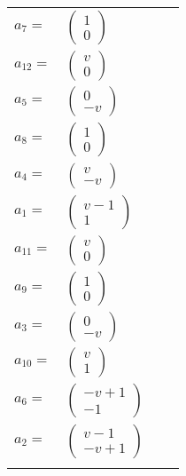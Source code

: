 \documentclass[1p]{elsarticle_modified}
\theoremstyle{definition}
\begin{document}
\begin{tabular}{m{7pt} m{180pt} m{7pt} m{180pt} }
\flushright $a_{7}=$&$\begin{pmatrix}1\\0\end{pmatrix}$ \\
\flushright $a_{12}=$&$\begin{pmatrix}v\\0\end{pmatrix}$ \\
\flushright $a_{5}=$&$\begin{pmatrix}0\\- v\end{pmatrix}$ \\
\flushright $a_{8}=$&$\begin{pmatrix}1\\0\end{pmatrix}$ \\
\flushright $a_{4}=$&$\begin{pmatrix}v\\- v\end{pmatrix}$ \\
\flushright $a_{1}=$&$\begin{pmatrix}v-1\\1\end{pmatrix}$ \\
\flushright $a_{11}=$&$\begin{pmatrix}v\\0\end{pmatrix}$ \\
\flushright $a_{9}=$&$\begin{pmatrix}1\\0\end{pmatrix}$ \\
\flushright $a_{3}=$&$\begin{pmatrix}0\\- v\end{pmatrix}$ \\
\flushright $a_{10}=$&$\begin{pmatrix}v\\1\end{pmatrix}$ \\
\flushright $a_{6}=$&$\begin{pmatrix}- v+1\\-1\end{pmatrix}$ \\
\flushright $a_{2}=$&$\begin{pmatrix}v-1\\- v+1\end{pmatrix}$\\&\end{tabular}
\end{document}
